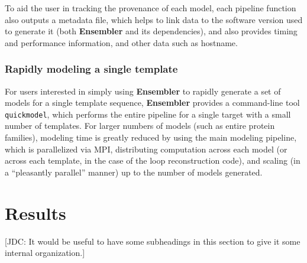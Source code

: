 \documentclass[aps,pre,twocolumn,nofootinbib,superscriptaddress,linenumbers]{revtex4-1}
\begin{document}
To aid the user in tracking the provenance of each model, each pipeline function also outputs a metadata file, which helps to link data to the software version used to generate it (both {\bf Ensembler} and its dependencies), and also provides timing and performance information, and other data such as hostname.

\subsubsection*{Rapidly modeling a single template}

For users interested in simply using {\bf Ensembler} to rapidly generate a set of models for a single template sequence, {\bf Ensembler} provides a command-line tool {\tt quickmodel}, which performs the entire pipeline for a single target with a small number of templates.
For larger numbers of models (such as entire protein families), modeling time is greatly reduced by using the main modeling pipeline, which is parallelized via MPI, distributing computation across each model (or across each template, in the case of the loop reconstruction code), and scaling (in a ``pleasantly parallel'' manner) up to the number of models generated.









\label{section:design}

\section{Results}
\label{section:results}

{\color{red}[JDC: It would be useful to have some subheadings in this section to give it some internal organization.]}
\end{document}

